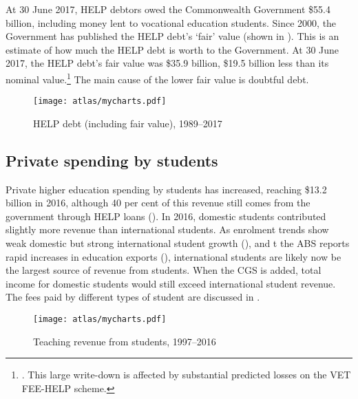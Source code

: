 \documentclass{grattan}
\begin{document}
At 30 June 2017, HELP debtors owed the Commonwealth Government \$55.4 billion, including money lent to vocational education students. Since 2000, the Government has published the HELP debt's `fair' value (shown in ). This is an estimate of how much the HELP debt is worth to the Government. At 30 June 2017, the HELP debt's fair value was \$35.9 billion, \$19.5 billion less than its nominal value.\footnote{\textcite[][128]{DepartmentofEducationandTraining2017annualreport2016}. This large write-down is affected by substantial predicted losses on the VET FEE-HELP scheme.} The main cause of the lower fair value is doubtful debt.


    \begin{figure} %
    \caption{HELP debt (including fair value), 1989--2017}\label{fig:help-debt-including-fair-value-19892017}
    \texttt{[image: atlas/mycharts.pdf]}
    \end{figure}



%
\subsection{Private spending by students}\label{subsec:private-spending-by-students}

Private higher education spending by students has increased, reaching \$13.2 billion in 2016, although 40 per cent of this revenue still comes from the government through HELP loans (). In 2016, domestic students contributed slightly more revenue than international students. As enrolment trends show weak domestic but strong international student growth (), and t the ABS reports rapid increases in education exports (), international students are likely now be the largest source of revenue from students. When the CGS is added, total income for domestic students would still exceed international student revenue. The fees paid by different types of student are discussed in .


    \begin{figure} %
    \caption{Teaching revenue from students, 1997--2016}\label{fig:teaching-revenue-from-students-19972016}
    \texttt{[image: atlas/mycharts.pdf]}
    \end{figure}
\end{document}
